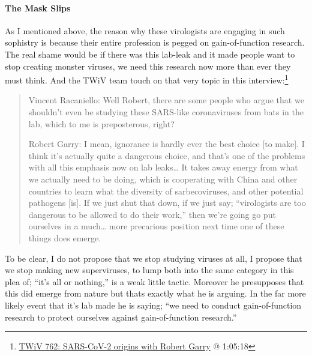 \documentclass[11pt]{article}
\begin{document}
\paragraph{The Mask Slips}
\label{sec:org7d96399}
As I mentioned above, the reason why these virologists are engaging in such sophistry is because their entire profession is pegged on gain-of-function research. The real shame would be if there was this lab-leak and it made people want to stop creating monster viruses, we need this research now more than ever they must think. And the TWiV team touch on that very topic in this interview:\footnote{\href{https://youtu.be/IxwrDSYrhjU?t=3918}{TWiV 762: SARS-CoV-2 origins with Robert Garry} @ 1:05:18}
\begin{quote}
Vincent Racaniello: Well Robert, there are some people who argue that we shouldn't even be studying these SARS-like coronaviruses from bats in the lab, which to me is preposterous, right?

Robert Garry: I mean, ignorance is hardly ever the best choice [to make]. I think it's actually quite a dangerous choice, and that's one of the problems with all this emphasis now on lab leaks\ldots{} It takes away energy from what we actually need to be doing, which is cooperating with China and other countries to learn what the diversity of sarbecoviruses, and other potential pathogens [is]. If we just shut that down, if we just say; ``virologists are too dangerous to be allowed to do their work,'' then we're going go put ourselves in a much\ldots{} more precarious position next time one of these things does emerge.
\end{quote}
To be clear, I do not propose that we stop studying viruses at all, I propose that we stop making new superviruses, to lump both into the same category in this plea of; ``it's all or nothing,'' is a weak little tactic. Moreover he presupposes that this did emerge from nature but thats exactly what he is arguing. In the far more likely event that it's lab made he is saying; ``we need to conduct gain-of-function research to protect ourselves against gain-of-function research.''
\end{document}

